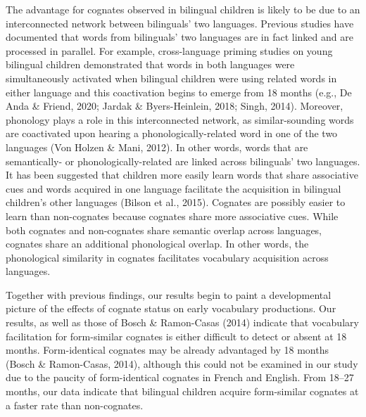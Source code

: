 \documentclass[
  english,
  ,man,floatsintext]{apa6}
\begin{document}
The advantage for cognates observed in bilingual children is likely to be due to an interconnected network between bilinguals' two languages. Previous studies have documented that words from bilinguals' two languages are in fact linked and are processed in parallel. For example, cross-language priming studies on young bilingual children demonstrated that words in both languages were simultaneously activated when bilingual children were using related words in either language and this coactivation begins to emerge from 18 months (e.g., De Anda \& Friend, 2020; Jardak \& Byers-Heinlein, 2018; Singh, 2014). Moreover, phonology plays a role in this interconnected network, as similar-sounding words are coactivated upon hearing a phonologically-related word in one of the two languages (Von Holzen \& Mani, 2012). In other words, words that are semantically- or phonologically-related are linked across bilinguals' two languages. It has been suggested that children more easily learn words that share associative cues and words acquired in one language facilitate the acquisition in bilingual children's other languages (Bilson et al., 2015). Cognates are possibly easier to learn than non-cognates because cognates share more associative cues. While both cognates and non-cognates share semantic overlap across languages, cognates share an additional phonological overlap. In other words, the phonological similarity in cognates facilitates vocabulary acquisition across languages.

Together with previous findings, our results begin to paint a developmental picture of the effects of cognate status on early vocabulary productions. Our results, as well as those of Bosch \& Ramon-Casas (2014) indicate that vocabulary facilitation for form-similar cognates is either difficult to detect or absent at 18 months. Form-identical cognates may be already advantaged by 18 months (Bosch \& Ramon-Casas, 2014), although this could not be examined in our study due to the paucity of form-identical cognates in French and English. From 18--27 months, our data indicate that bilingual children acquire form-similar cognates at a faster rate than non-cognates.
\end{document}
